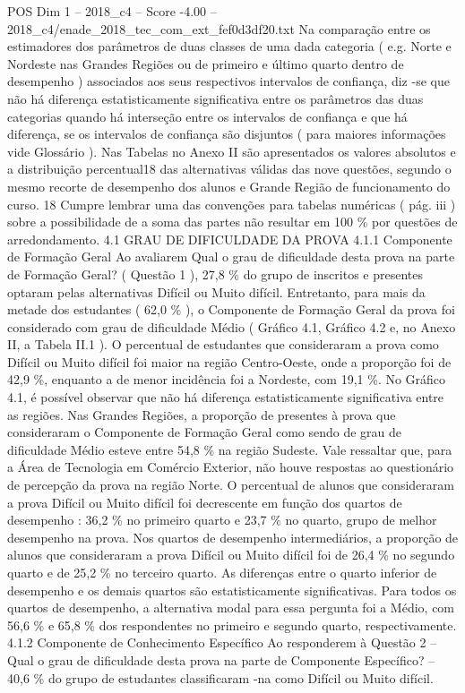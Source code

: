\begin{textsample}{POS Dim 1 – 2018\_c4 – Score -4.00 – 2018\_c4/enade\_2018\_tec\_com\_ext\_fef0d3df20.txt}
Na comparação entre os estimadores dos parâmetros de duas classes de uma dada categoria ( e.g.
Norte e Nordeste nas Grandes Regiões ou de primeiro e último quarto dentro de desempenho ) associados aos seus respectivos intervalos de confiança, diz -se que não há diferença estatisticamente significativa entre os parâmetros das duas categorias quando há interseção entre os intervalos de confiança e que há diferença, se os intervalos de confiança são disjuntos ( para maiores informações vide Glossário ).
Nas Tabelas no Anexo II são apresentados os valores absolutos e a distribuição percentual18 das alternativas válidas das nove questões, segundo o mesmo recorte de desempenho dos alunos e Grande Região de funcionamento do curso. 18 Cumpre lembrar uma das convenções para tabelas numéricas ( pág. iii ) sobre a possibilidade de a soma das partes não resultar em 100 \% por questões de arredondamento. 4.1 GRAU DE DIFICULDADE DA PROVA 4.1.1 Componente de Formação Geral Ao avaliarem Qual o grau de dificuldade desta prova na parte de Formação Geral? ( Questão 1 ), 27,8 \% do grupo de inscritos e presentes optaram pelas alternativas Difícil ou Muito difícil.
Entretanto, para mais da metade dos estudantes ( 62,0 \% ), o Componente de Formação Geral da prova foi considerado com grau de dificuldade Médio ( Gráfico 4.1, Gráfico 4.2 e, no Anexo II, a Tabela II.1 ).
O percentual de estudantes que consideraram a prova como Difícil ou Muito difícil foi maior na região Centro-Oeste, onde a proporção foi de 42,9 \%, enquanto a de menor incidência foi a Nordeste, com 19,1 \%.
No Gráfico 4.1, é possível observar que não há diferença estatisticamente significativa entre as regiões.
Nas Grandes Regiões, a proporção de presentes à prova que consideraram o Componente de Formação Geral como sendo de grau de dificuldade Médio esteve entre 54,8 \% na região Sudeste.
Vale ressaltar que, para a Área de Tecnologia em Comércio Exterior, não houve respostas ao questionário de percepção da prova na região Norte.
O percentual de alunos que consideraram a prova Difícil ou Muito difícil foi decrescente em função dos quartos de desempenho : 36,2 \% no primeiro quarto e 23,7 \% no quarto, grupo de melhor desempenho na prova.
Nos quartos de desempenho intermediários, a proporção de alunos que consideraram a prova Difícil ou Muito difícil foi de 26,4 \% no segundo quarto e de 25,2 \% no terceiro quarto.
As diferenças entre o quarto inferior de desempenho e os demais quartos são estatisticamente significativas.
Para todos os quartos de desempenho, a alternativa modal para essa pergunta foi a Médio, com 56,6 \% e 65,8 \% dos respondentes no primeiro e segundo quarto, respectivamente. 4.1.2 Componente de Conhecimento Específico Ao responderem à Questão 2 – Qual o grau de dificuldade desta prova na parte de Componente Específico? – 40,6 \% do grupo de estudantes classificaram -na como Difícil ou Muito difícil.

\end{textsample}
